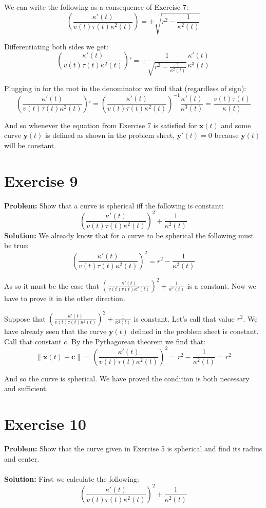 \documentclass{article}
\begin{document}
We can write the following as a consequence of Exercise 7:
$$\left(\frac{\kappa'(t)}{v(t)\tau(t)\kappa^2(t)}\right)=\pm\sqrt{r^2-\frac{1}{\kappa^2(t)}}$$

Differentiating both sides we get:
$$\left(\frac{\kappa'(t)}{v(t)\tau(t)\kappa^2(t)}\right)'=\pm\frac{1}{\sqrt{r^2-\frac{1}{\kappa^2(t)}}}\frac{\kappa'(t)}{\kappa^3(t)}$$

Plugging in for the root in the denominator we find that (regardless of sign):
$$\left(\frac{\kappa'(t)}{v(t)\tau(t)\kappa^2(t)}\right)'=\left(\frac{\kappa'(t)}{v(t)\tau(t)\kappa^2(t)}\right)^{-1}\frac{\kappa'(t)}{\kappa^3(t)}=\frac{v(t)\tau(t)}{\kappa(t)}$$

And so whenever the equation from Exercise 7 is satisfied for $\mathbf x(t)$ and some curve $\mathbf y(t)$ is defined as shown in the problem sheet, $\mathbf y'(t)=0$ because $\mathbf y(t)$ will be constant.

\section*{Exercise 9}
\textbf{Problem:} Show that a curve is spherical iff the following is constant:
$$\left(\frac{\kappa'(t)}{v(t)\tau(t)\kappa^2(t)}\right)^2+\frac{1}{\kappa^2(t)}$$
\textbf{Solution:} We already know that for a curve to be spherical the following must be true:
$$\left(\frac{\kappa'(t)}{v(t)\tau(t)\kappa^2(t)}\right)^2=r^2-\frac{1}{\kappa^2(t)}$$

As so it must be the case that $\left(\frac{\kappa'(t)}{v(t)\tau(t)\kappa^2(t)}\right)^2+\frac{1}{\kappa^2(t)}$ is a constant. Now we have to prove it in the other direction.

Suppose that $\left(\frac{\kappa'(t)}{v(t)\tau(t)\kappa^2(t)}\right)^2+\frac{1}{\kappa^2(t)}$ is constant. Let's call that value $r^2$. We have already seen that the curve $\mathbf y(t)$ defined in the problem sheet is constant. Call that constant $c$. By the Pythagorean theorem we find that:
$$\|\mathbf x(t)-\mathbf c\|=\left(\frac{\kappa'(t)}{v(t)\tau(t)\kappa^2(t)}\right)^2=r^2-\frac{1}{\kappa^2(t)}=r^2$$

And so the curve is spherical. We have proved the condition is both necessary and sufficient.

\section*{Exercise 10}
\textbf{Problem:} Show that the curve given in Exercise 5 is spherical and find its radius and center.
\\\\
\textbf{Solution:} First we calculate the following:
$$\left(\frac{\kappa'(t)}{v(t)\tau(t)\kappa^2(t)}\right)^2+\frac{1}{\kappa^2(t)}$$
\end{document}
